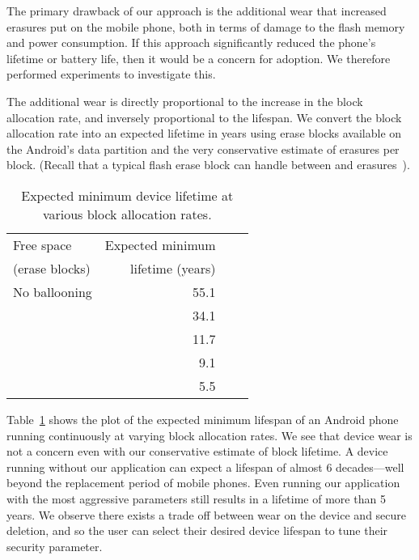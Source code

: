 \documentclass{acmtog}
\begin{document}
The primary drawback of our approach is the additional wear that
increased erasures put on the mobile phone, both in terms of damage
to the flash memory and power consumption. If this approach
significantly reduced the phone's lifetime or battery life,
then it would be a concern for adoption. We therefore performed experiments to investigate this.

The additional wear is directly proportional to the increase in the block
allocation rate, and inversely proportional to the lifespan. We
convert the block allocation rate into an expected lifetime in years
using  erase blocks available on the
Android's data partition and the very conservative estimate of  erasures per
block. (Recall that a typical flash erase block can
handle between  and  erasures~\cite{flashlife}).



\begin{table}[t]
\centering
\begin{tabular}{lrrr}
\hline
Free space   & Expected minimum \\
(erase blocks)  & lifetime (years) &  \\
\hline
No ballooning & 55.1 \\ 
 & 34.1  \\
 & 11.7 \\
 & 9.1 \\
 & 5.5 \\

\hline

\end{tabular}

\caption{\small Expected minimum device lifetime at various block allocation rates.
\label{t:life}\normalsize}
\end{table}


Table~\ref{t:life} shows the plot of the expected minimum lifespan of an
Android phone running continuously at varying block allocation
rates. We see that device wear is  not a concern even with
our conservative estimate of block lifetime. A device running without
our application can expect a lifespan of almost 6 decades---well beyond the
replacement period of mobile phones. Even running our application with
the most aggressive parameters still results in a lifetime of more than 5 years.
We observe there exists a trade off between wear on the device and secure
deletion, and so the user can select their desired device lifespan to
tune their security parameter.
\end{document}
